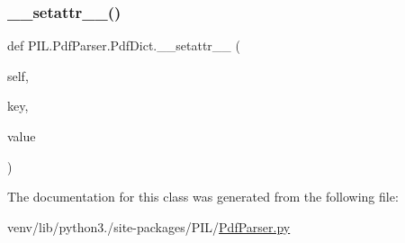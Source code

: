 \subsubsection{\texorpdfstring{\+\_\+\+\_\+setattr\+\_\+\+\_\+()}{\_\_setattr\_\_()}}
{\footnotesize\ttfamily def P\+I\+L.\+Pdf\+Parser.\+Pdf\+Dict.\+\_\+\+\_\+setattr\+\_\+\+\_\+ (\begin{DoxyParamCaption}\item[{}]{self,  }\item[{}]{key,  }\item[{}]{value }\end{DoxyParamCaption})}



The documentation for this class was generated from the following file\+:\begin{DoxyCompactItemize}
\item 
venv/lib/python3./site-\/packages/\+P\+I\+L/\hyperlink{PdfParser_8py}{Pdf\+Parser.\+py}\end{DoxyCompactItemize}
